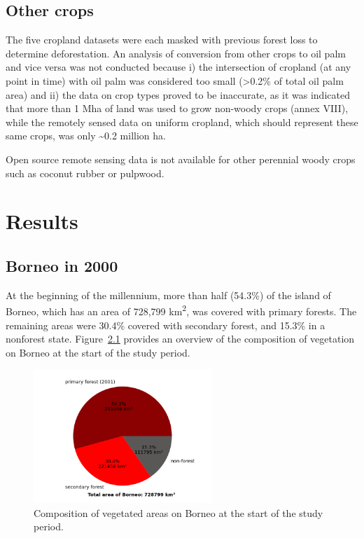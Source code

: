 \documentclass[
  letterpaper,
  DIV=11,
  numbers=noendperiod]{scrreprt}
\begin{document}
\hypertarget{other-crops-1}{%
\section{Other crops}\label{other-crops-1}}

The five cropland datasets were each masked with previous forest loss to
determine deforestation. An analysis of conversion from other crops to
oil palm and vice versa was not conducted because i) the intersection of
cropland (at any point in time) with oil palm was considered too small
(\textgreater0.2\% of total oil palm area) and ii) the data on crop
types proved to be inaccurate, as it was indicated that more than 1 Mha
of land was used to grow non-woody crops (annex VIII), while the
remotely sensed data on uniform cropland, which should represent these
same crops, was only \textasciitilde0.2 million ha.

Open source remote sensing data is not available for other perennial
woody crops such as coconut rubber or pulpwood.


\hypertarget{results}{%
\chapter{Results}\label{results}}

\hypertarget{borneo-in-2000}{%
\section{Borneo in 2000}\label{borneo-in-2000}}

At the beginning of the millennium, more than half (54.3\%) of the
island of Borneo, which has an area of 728,799 km\textsuperscript{2},
was covered with primary forests. The remaining areas were 30.4\%
covered with secondary forest, and 15.3\% in a nonforest state.
Figure~\ref{fig-piefcover2000} provides an overview of the composition
of vegetation on Borneo at the start of the study period.

\begin{figure}

{\centering \includegraphics[width=0.6\textwidth,height=\textheight]{text/../code/results/final_plots/fcover_2000.png}

}

\caption{\label{fig-piefcover2000}Composition of vegetated areas on
Borneo at the start of the study period.}

\end{figure}
\end{document}
